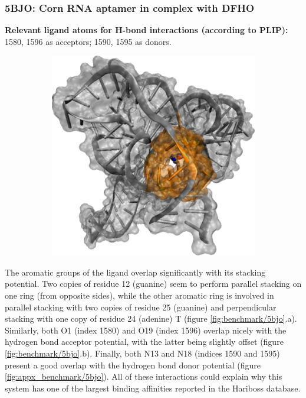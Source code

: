     \subsubsection{5BJO: Corn RNA aptamer in complex with DFHO}
      \textbf{Relevant ligand atoms for H-bond interactions (according to PLIP):} 1580, 1596 as acceptors; 1590, 1595 as donors.

      \begin{figure}[H] \centering
        \begin{subfigure}[c]{0.3\textwidth} \centering
          \includegraphics[width=1\textwidth]{figures/results/ps_rna/5kx9.png}
        \end{subfigure}
        \begin{subfigure}[c]{0.3\textwidth} \centering
        \end{subfigure}
      \end{figure}

      The aromatic groups of the ligand overlap significantly with its stacking potential. Two copies of residue 12 (guanine) seem to perform parallel stacking on one ring (from opposite sides), while the other aromatic ring is involved in parallel stacking with two copies of residue 25 (guanine) and perpendicular stacking with one copy of residue 24 (adenine) T (figure \ref{fig:benchmark/5bjo}.a). Similarly, both O1 (index 1580) and O19 (index 1596) overlap nicely with the hydrogen bond acceptor potential, with the latter being slightly offset (figure \ref{fig:benchmark/5bjo}.b). Finally, both N13 and N18 (indices 1590 and 1595) present a good overlap with the hydrogen bond donor potential (figure \ref{fig:appx_benchmark/5bjo}). All of these interactions could explain why this system has one of the largest binding affinities reported in the Hariboss database.

